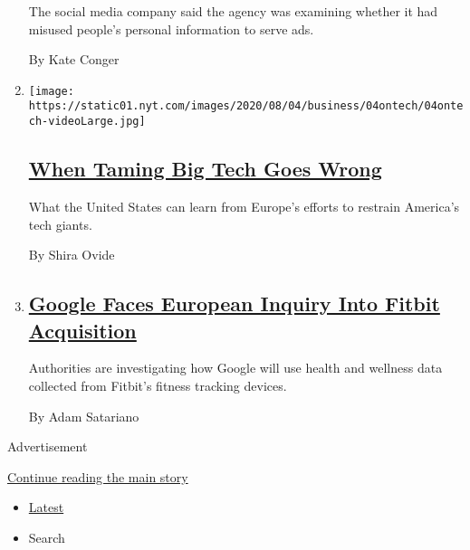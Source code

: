 \begin{enumerate}
  The social media company said the agency was examining whether it had
  misused people's personal information to serve ads.

  By Kate Conger
\item
  \texttt{[image: https://static01.nyt.com/images/2020/08/04/business/04ontech/04ontech-videoLarge.jpg]}

  \hypertarget{when-taming-big-tech-goes-wrong}{%
  \subsection{\texorpdfstring{\href{/2020/08/04/technology/europe-big-tech.html}{When
  Taming Big Tech Goes
  Wrong}}{When Taming Big Tech Goes Wrong}}\label{when-taming-big-tech-goes-wrong}}

  What the United States can learn from Europe's efforts to restrain
  America's tech giants.

  By Shira Ovide
\item
  \hypertarget{google-faces-european-inquiry-into-fitbit-acquisition}{%
  \subsection{\texorpdfstring{\href{/2020/08/04/business/google-fitbit-europe.html}{Google
  Faces European Inquiry Into Fitbit
  Acquisition}}{Google Faces European Inquiry Into Fitbit Acquisition}}\label{google-faces-european-inquiry-into-fitbit-acquisition}}

  Authorities are investigating how Google will use health and wellness
  data collected from Fitbit's fitness tracking devices.

  By Adam Satariano
\end{enumerate}

Advertisement

\protect\hyperlink{after-mid2}{Continue reading the main story}

\begin{itemize}
\tightlist
\item
  \protect\hyperlink{stream-panel}{Latest}
\item
  Search
\end{itemize}

